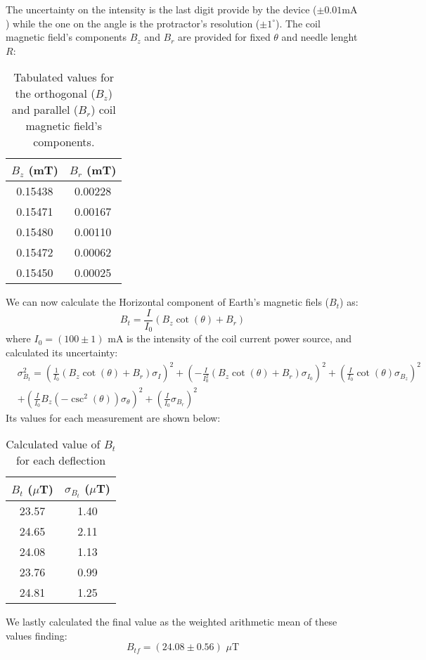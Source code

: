 The uncertainty on the intensity is the last digit provide by the device ($\pm 0.01 \text{mA}$) while the one on the angle is the protractor's resolution ($\pm 1^{\circ}$).
The coil magnetic field's components $B_z$ and $B_r$ are provided for fixed $\theta$ and needle lenght $R$:
\begin{table}[!htbp]
    {\par\centering
    \begin{tabular}{cc}
        \hline
        $B_z$ (mT) & $B_r$ (mT) \\
        \hline
        0.15438 & 0.00228 \\
        0.15471 & 0.00167 \\
        0.15480 & 0.00110 \\
        0.15472 & 0.00062 \\
        0.15450 & 0.00025 \\
        \hline
    \end{tabular}
    \par}
    \caption{Tabulated values for the orthogonal ($B_z$) and parallel ($B_r$) coil magnetic field's components.}
\end{table}

We can now calculate the Horizontal component of Earth's magnetic fiels ($B_t$) as:
\begin{equation*}
    B_t=\frac{I}{I_0}(B_z \cot{(\theta)}+B_r)
\end{equation*}
where $I_0=(100\pm 1)$ mA is the intensity of the coil current power source, and calculated its uncertainty:
\begin{align*}
    &\sigma_{B_t}^2 = \left( \frac{1}{I_0} \left( B_z \cot(\theta) + B_r \right) \sigma_I \right)^2 + \left( -\frac{I}{I_0^2} \left( B_z \cot(\theta) + B_r \right) \sigma_{I_0} \right)^2 + \left( \frac{I}{I_0} \cot(\theta) \sigma_{B_z} \right)^2 \\
    &+ \left( \frac{I}{I_0} B_z \left( -\csc^2(\theta) \right) \sigma_\theta \right)^2 + \left( \frac{I}{I_0} \sigma_{B_r} \right)^2
\end{align*}
Its values for each measurement are shown below:
\begin{table}[!htbp]
    {\par\centering
    \begin{tabular}{cc}
        \hline
        $B_t$ ($\mu$T) & $\sigma_{B_t}$ ($\mu$T) \\
        \hline
        23.57 & 1.40 \\
        24.65 & 2.11 \\
        24.08 & 1.13 \\
        23.76 & 0.99 \\
        24.81 & 1.25 \\
        \hline
    \end{tabular}
    \par}
    \caption{Calculated value of $B_t$ for each deflection}
\end{table}

We lastly calculated the final value as the weighted arithmetic mean of these values finding:
\begin{equation*}
    B_{tf}=(24.08\pm0.56)\,\, \mu\mathrm{T}
\end{equation*}

